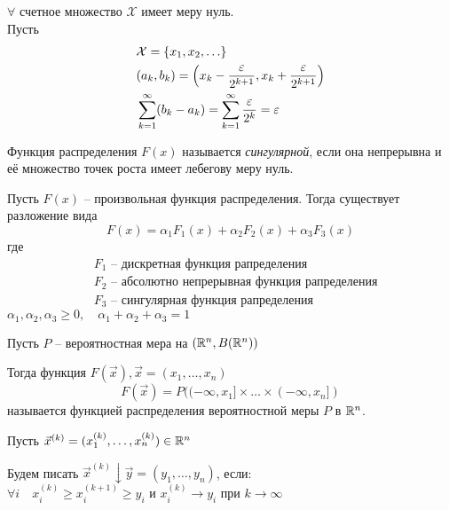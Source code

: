 \begin{example}
	$\forall$ счетное множество $\mathcal{X}$ имеет меру нуль.\\
	Пусть 
		\begin{align*}			
			&\mathcal{X} = \{ x_1, x_2, \ldots \}\\
			&(a_k, b_k) = \left( x_k - \frac{\varepsilon}{2^{k + 1}}, x_k + \frac{\varepsilon}{2^{k + 1}} \right)\\
			&\sum_{k = 1}^{\infty} (b_k - a_k) = \sum_{k = 1}^{\infty} \frac{\varepsilon}{2^k} = \varepsilon
		\end{align*}	
\end{example}

\begin{definition}
	Функция распределения $F(x)$ называется \emph{сингулярной}, 
	если она непрерывна и её множество точек роста имеет лебегову меру нуль.
\end{definition}

\begin{theorem}[Лебег]
	Пусть $F(x)$ -- произвольная функция распределения. Тогда существует разложение вида
	\begin{equation*}
		F(x) = \alpha_1 F_1(x) + \alpha_2 F_2(x) + \alpha_3 F_3(x)
	\end{equation*}	 
	где 
	\begin{align*}
		&F_1 \text{ -- дискретная функция рапределения}\\
		&F_2 \text{ -- абсолютно непрерывная функция рапределения}\\
		&F_3 \text{ -- сингулярная функция рапределения}
	\end{align*}
	$\alpha_1, \alpha_2, \alpha_3 \geq 0,\quad \alpha_1 + \alpha_2 + \alpha_3 = 1$
\end{theorem}


\begin{definition}
	Пусть $P$ -- вероятностная мера на $(\mathbb{R}^n , B(\mathbb{R}^n))$

	Тогда функция $F(\vec{x}), \vec{x} = (x_1, \ldots, x_n)$
	\begin{equation*}
		F(\vec{x}) = P((-\infty, x_1] \times \ldots \times (-\infty, x_n])
	\end{equation*}
	называется функцией распределения вероятностной меры $P$ в $\mathbb{R}^n$.
\end{definition}

\begin{designations}
	Пусть $\vec{x}^{(k)} = (x_1^{(k)}, \ldots, x_n^{(k)}) \in \mathbb{R}^n$

	Будем писать $\vec{x}^{(k)} \downarrow \vec{y} = (y_1, \ldots, y_n)$, если:\\
	$\forall i \quad x_i^{(k)} \geq x_i^{(k + 1)} \geq y_i$ и $x_i^{(k)} \to y_i$ при $k \to \infty$
\end{designations}

